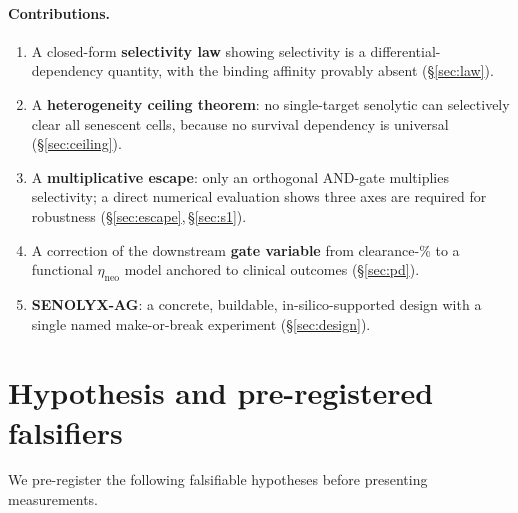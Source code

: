 \documentclass[11pt,a4paper]{article}
\begin{document}
\paragraph{Contributions.}
\begin{enumerate}
\item A closed-form \textbf{selectivity law} showing selectivity is a
  differential-dependency quantity, with the binding affinity provably absent
  (\S\ref{sec:law}).
\item A \textbf{heterogeneity ceiling theorem}: no single-target senolytic can
  selectively clear all senescent cells, because no survival dependency is
  universal (\S\ref{sec:ceiling}).
\item A \textbf{multiplicative escape}: only an orthogonal AND-gate multiplies
  selectivity; a direct numerical evaluation shows three axes are required for
  robustness (\S\ref{sec:escape},\,\S\ref{sec:s1}).
\item A correction of the downstream \textbf{gate variable} from clearance-\%
  to a functional $\eta_{\mathrm{neo}}$ model anchored to clinical outcomes
  (\S\ref{sec:pd}).
\item \textbf{SENOLYX-AG}: a concrete, buildable, in-silico-supported design
  with a single named make-or-break experiment (\S\ref{sec:design}).
\end{enumerate}

\section{Hypothesis and pre-registered falsifiers}
\label{sec:hypothesis}

We pre-register the following falsifiable hypotheses before presenting
measurements.
\end{document}
